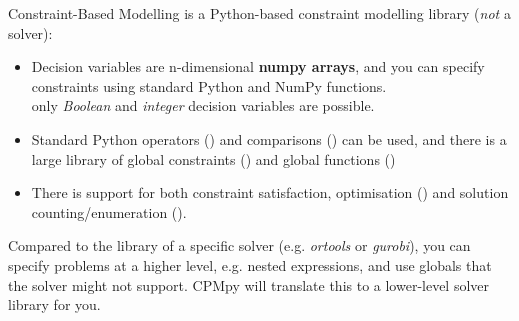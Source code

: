 \documentclass{cons-beamer}
\begin{document}
\begin{flashcardcpmpy}
\begin{frame}{Constraint-Based Modelling}
   is a Python-based constraint modelling
  \alert{library} (\emph{not} a solver): \vfill
  \begin{itemize}
    \item Decision variables are n-dimensional \textbf{numpy arrays}, and you can specify constraints using standard Python and NumPy functions.\\
          only \textit{Boolean} and \textit{integer} decision variables are possible. \vfill

    \item Standard Python operators () and comparisons (\cpminline{== >= > != <= <}) can be used, and there is a large library of global constraints () and global functions () \vfill
  
    \item There is support for both constraint satisfaction, optimisation () and solution counting/enumeration (). \vfill
  \end{itemize}
  
  Compared to the library of a specific solver (e.g. \textit{ortools} or \textit{gurobi}), you can specify problems at a higher level, e.g. nested expressions, and use globals that the solver might not support. CPMpy will translate this to a lower-level solver library for you.
\end{frame}
\end{flashcardcpmpy}
\end{document}
